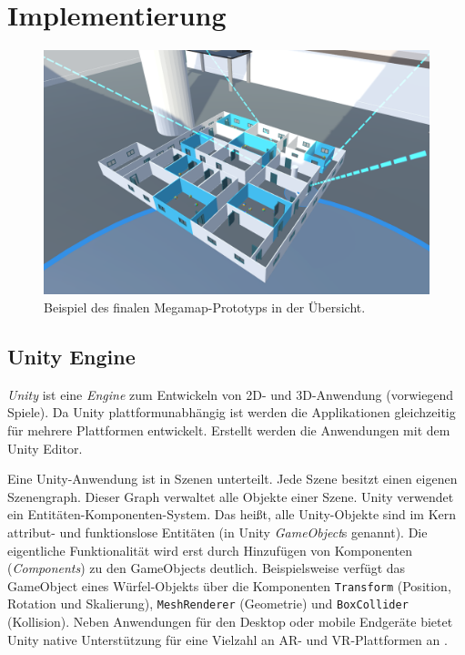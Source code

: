 \chapter{Implementierung}
\label{chap:implementation}
\begin{figure}[h!]
    \centering
    \includegraphics[width=\linewidth]{figures/screenshots/condition_3d_l_x}
    \caption{Beispiel des finalen Megamap-Prototyps in der Übersicht.}
    \label{fig:megamap_overview}
\end{figure}

\section{Unity Engine}
\emph{Unity} \autocite{UnityTechnologies2018} ist eine \emph{Engine} zum Entwickeln von 2D- und 3D-Anwendung (vorwiegend Spiele).
Da Unity plattformunabhängig ist werden die Applikationen gleichzeitig für mehrere Plattformen entwickelt.
Erstellt werden die Anwendungen mit dem Unity Editor.

Eine Unity-Anwendung ist in Szenen unterteilt.
Jede Szene besitzt einen eigenen Szenengraph.
Dieser Graph verwaltet alle Objekte einer Szene.
Unity verwendet ein Entitäten-Komponenten-System.
Das heißt, alle Unity-Objekte sind im Kern attribut- und funktionslose Entitäten (in Unity \emph{GameObject}s genannt).
Die eigentliche Funktionalität wird erst durch Hinzufügen von Komponenten (\emph{Components}) zu den GameObjects deutlich.
Beispielsweise verfügt das GameObject eines Würfel-Objekts über die Komponenten \lstinline{Transform} (Position, Rotation und Skalierung), \lstinline{MeshRenderer} (Geometrie) und \lstinline{BoxCollider} (Kollision).
Neben Anwendungen für den Desktop oder mobile Endgeräte bietet Unity native Unterstützung für eine Vielzahl an AR- und VR-Plattformen an \parencite{UnityTechnologies2018b}.

